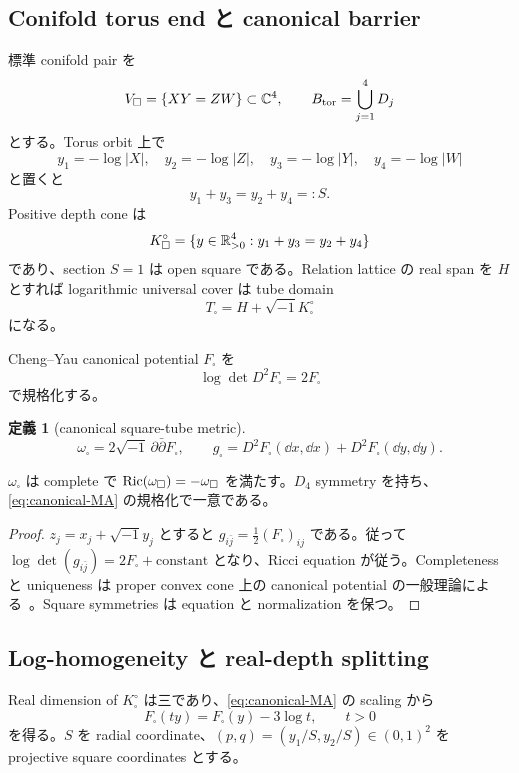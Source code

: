 \documentclass[11pt,a4paper]{ltjsarticle}
\newcommand{\gsq}{g_{\square}}\newcommand{\omsq}{\omega_{\square}}
\newcommand{\Fbox}{F_{\square}}\newcommand{\ddc}{\sqrt{-1}\,\partial\bar\partial}
\theoremstyle{plain}
\theoremstyle{definition}
\newtheorem{definition}[theorem]{定義}\newtheorem{hypothesis}[theorem]{仮定}
\theoremstyle{remark}
\begin{document}
\subsection{Conifold torus end と canonical barrier}
標準 conifold pair を
\[
 V_{\square}=\{XY=ZW\}\subset\mathbb C^4,
 \qquad
 B_{\mathrm{tor}}=\bigcup_{j=1}^4D_j
\]
とする。Torus orbit 上で
\[
 y_1=-\log|X|,\quad y_2=-\log|Z|,\quad
 y_3=-\log|Y|,\quad y_4=-\log|W|
\]
と置くと
\begin{equation}\label{eq:conifold-depth-relation}
 y_1+y_3=y_2+y_4=:S.
\end{equation}
Positive depth cone は
\begin{equation}\label{eq:positive-cone}
 K_{\square}^{\circ}=\{y\in\mathbb R_{>0}^4:y_1+y_3=y_2+y_4\}
\end{equation}
であり、section $S=1$ は open square である。Relation lattice の real span を $H$ とすれば logarithmic universal cover は tube domain
\[
 T_{\square}=H+\sqrt{-1}K_{\square}^{\circ}
\]
になる。

Cheng--Yau canonical potential $\Fbox$ を~\cite{CY,Fox,Hildebrand}
\begin{equation}\label{eq:canonical-MA}
 \log\det D^2\Fbox=2\Fbox
\end{equation}
で規格化する。

\begin{definition}[canonical square-tube metric]
\[
 \omsq=2\sqrt{-1}\,\partial\bar\partial\Fbox,
 \qquad
 \gsq=D^2\Fbox(\dd x,\dd x)+D^2\Fbox(\dd y,\dd y).
\]
\end{definition}

\begin{proposition}\label{prop:square-Einstein}
$\omsq$ は complete で $\Ric(\omsq)=-\omsq$ を満たす。$D_4$ symmetry を持ち、\cref{eq:canonical-MA} の規格化で一意である。
\end{proposition}

\begin{proof}
$z_j=x_j+\sqrt{-1}y_j$ とすると $g_{i\bar j}=\frac12(\Fbox)_{ij}$ である。従って $\log\det(g_{i\bar j})=2\Fbox+\mathrm{constant}$ となり、Ricci equation が従う。Completeness と uniqueness は proper convex cone 上の canonical potential の一般理論による~\cite{CY,Fox,Hildebrand}。Square symmetries は equation と normalization を保つ。
\end{proof}

\subsection{Log-homogeneity と real-depth splitting}
Real dimension of $K_{\square}^{\circ}$ は三であり、\cref{eq:canonical-MA} の scaling から
\begin{equation}\label{eq:log-homogeneity}
 \Fbox(ty)=\Fbox(y)-3\log t,
 \qquad t>0
\end{equation}
を得る。$S$ を radial coordinate、$(p,q)=(y_1/S,y_2/S)\in(0,1)^2$ を projective square coordinates とする。
\end{document}
